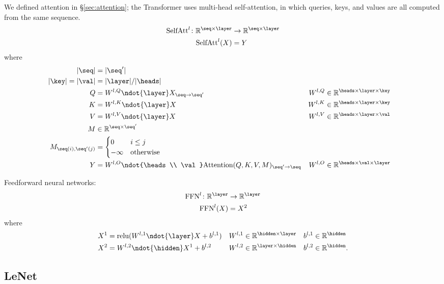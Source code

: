 We defined attention in \S\ref{sec:attention}; the Transformer uses multi-head self-attention, in which queries, keys, and values are all computed from the same sequence.
\begin{align*}
  \text{SelfAtt}^l \colon \reals^{\seq \times \layer} &\rightarrow \reals^{\seq \times \layer} \\
  \text{SelfAtt}^l(X) &= Y
\end{align*}
where
\begin{align*}
  |\seq| &= |\seq'| \\
  |\key| = |\val| &= |\layer|/|\heads| \\
  Q &= W^{l,Q} \ndot{\layer} X_{\seq\rightarrow\seq'} & W^{l,Q} &\in \reals^{\heads \times \layer \times \key} \\
  K &= W^{l,K} \ndot{\layer} X & W^{l,K} &\in \reals^{\heads \times \layer \times \key} \\
  V &= W^{l,V} \ndot{\layer} X & W^{l,V} &\in \reals^{\heads \times \layer \times \val} \\
  M & \in \reals^{\seq \times \seq'} \\
  M_{\seq(i), \seq'(j)} &= \begin{cases}
    0 & i \leq j\\
    -\infty & \text{otherwise}
  \end{cases} \\
  Y &= W^{l,O} \ndot{\heads \\ \val} \text{Attention}(Q, K, V, M)_{\seq'\rightarrow\seq} & W^{l,O} &\in \reals^{\heads \times \val \times \layer}
\end{align*}

Feedforward neural networks:
\begin{align*}
  \text{FFN}^l \colon \reals^{\layer} &\rightarrow \reals^{\layer} \\
  \text{FFN}^l(X) &= X^2
\end{align*}
where
\begin{align*}
  X^1 &= \text{relu}(W^{l,1} \ndot{\layer} X + b^{l,1}) & W^{l,1} &\in \reals^{\hidden \times \layer} & b^{l,1} &\in \reals^{\hidden} \\
  X^2 &= W^{l,2} \ndot{\hidden} X^1 + b^{l,2} & W^{l,2} &\in \reals^{\layer \times \hidden} & b^{l,2} &\in \reals^{\hidden}.
\end{align*}

\subsection{LeNet}

